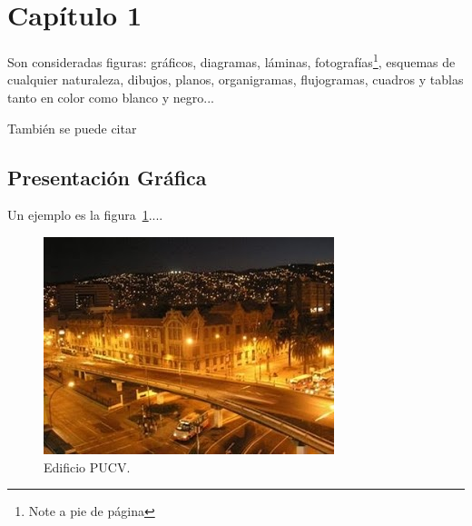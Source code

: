 \section{Capítulo 1}

Son consideradas figuras: gráficos, diagramas, láminas, fotografías\footnote{Note a pie de página},
esquemas de cualquier naturaleza, dibujos, planos, organigramas, flujogramas,
cuadros y tablas tanto en color como blanco y negro...

También se puede citar \cite{website:FileChooser}

\subsection{Presentación Gráfica}
       
Un ejemplo es la figura~\ref{fig:pucv}....

\begin{figure}[H]
    \begin{center}
        \includegraphics[width=0.6\linewidth]{Capitulo_1/imagenes/pucv.jpg} 
        \caption{Edificio PUCV.}\label{fig:pucv}
    \end{center}
\end{figure}
